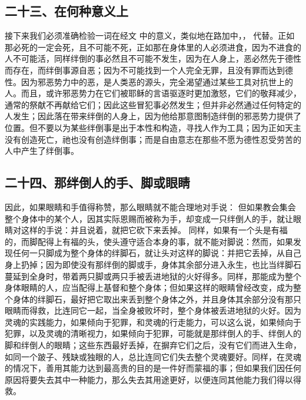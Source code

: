 
\subsection{二十三、在何种意义上}

接下来我们必须准确检验一词在经文 中的意义，类似地在路加中，， 代替。正如那必死的一定会死，且不可能不死，正如那在身体里的人必须进食，因为不进食的人不可能活，同样绊倒的事必然且不可能不发生，因为在人身上，恶必然先于德性而存在，而绊倒事源自恶；因为不可能找到一个人完全无罪，且没有罪而达到德性。因为邪恶势力中的恶，是人类恶的源头，完全渴望通过某些工具对抗世上的人。而且，或许邪恶势力在它们被耶稣的言语驱逐时更加激怒，它们的敬拜减少，通常的祭献不再献给它们；因此这些冒犯事必然发生；但并非必然通过任何特定的人发生；因此落在带来绊倒的人身上，因为他给那意图制造绊倒的邪恶势力提供了位置。但不要以为某些绊倒事是出于本性和构造，寻找人作为工具；因为正如天主没有创造死亡，祂也没有创造绊倒事；而是自由意志在那些不愿为德性忍受劳苦的人中产生了绊倒事。\par


\subsection{二十四、那绊倒人的手、脚或眼睛}

因此，如果眼睛和手值得称赞，那么眼睛就不能合理地对手说： 但如果教会集会整个身体中的某个人，因其实际恩赐而被称为手，却变成一只绊倒人的手，就让眼睛对这样的手说：并且说着，就把它砍下来丢掉。 同样，如果有一个头是有福的，而脚配得上有福的头，使头遵守适合本身的事，就不能对脚说：然而，如果发现任何一只脚成为整个身体的绊脚石，就让头对这样的脚说：并把它丢掉，从自己身上扔掉；因为即使没有那绊倒的脚或手，身体其余部分进入永生，也比当绊脚石蔓延到全身时，带着两只脚或两只手被丢进地狱的火好得多。同样，那能成为整个身体眼睛的人，应当配得上基督和整个身体；但如果这样的眼睛曾经改变，成为整个身体的绊脚石，最好把它取出来丢到整个身体之外，并且身体其余部分没有那只眼睛而得救，比连同它一起，当全身被败坏时，整个身体被丢进地狱的火好。因为灵魂的实践能力，如果倾向于犯罪，和灵魂的行走能力，可以这么说，如果倾向于犯罪，以及灵魂的清晰视力，如果倾向于犯罪，可能就是那绊倒人的手、绊倒人的脚和绊倒人的眼睛；这些东西最好丢掉，在摒弃它们之后，没有它们而进入生命，如同一个跛子、残缺或独眼的人，总比连同它们失去整个灵魂要好。同样，在灵魂的情况下，善用其能力达到最高贵的目的是一件好而蒙福的事；但如果我们因任何原因将要失去其中一种能力，那么失去其用途更好，以便连同其他能力我们得以得救。\par

